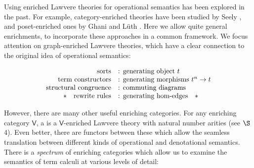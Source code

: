 \documentclass{amsart}
\newcommand{\define}[1]{{\bf \boldmath{#1}}}
\theoremstyle{definition}
\newcommand{\V}{\mathsf{V}}
\begin{document}
Using enriched Lawvere theories for operational semantics has been explored in the past. For example, category-enriched theories have been studied by Seely \cite{seely}, and poset-enriched ones by Ghani and L\"uth \cite{ghani}.  Here we allow quite general enrichments, to incorporate these approaches in a common framework.  We focus attention on graph-enriched Lawvere theories, which have a clear connection to the original idea of operational semantics:

\[\begin{array}{rl}
\text{sorts} & \text{: generating object } t\\
\text{term constructors} & \text{: generating morphisms } t^n \to t\\
\text{structural congruence} & \text{: commuting diagrams}\\
\text{\textasteriskcentered \quad rewrite rules} & \text{: generating hom-edges\quad\textasteriskcentered}\\
\end{array}\]

However, there are many other useful enriching categories.  For any enriching category $\V$, a \define{$\V$-theory} is a $\V$-enriched Lawvere theory with natural number arities (see $\S$4). Even better, there are functors between these which allow the seamless translation between different kinds of operational and denotational semantics.  There is a \textit{spectrum} of enriching categories which allow us to examine the semantics of term calculi at various levels of detail:
\end{document}
